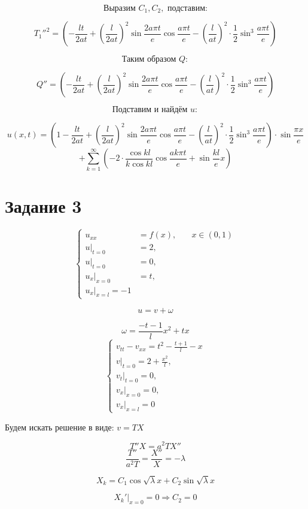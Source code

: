 \documentclass[a4paper,12pt]{article}
\begin{document}
$$\text{Выразим } C_1, C_2, \text{ подставим:}$$

$$T_1''^2 = \left(-\frac{lt}{2at} + \left(\frac{l}{2at}\right)^2 \sin \frac{2a\pi t}{e} \cos \frac{a\pi t}{e} - \left(\frac{l}{at}\right)^2 \cdot \frac{1}{2} \sin^3 \frac{a\pi t}{e} \right)$$

$$\text{Таким образом } Q:$$

$$Q'' = \left(-\frac{lt}{2at} + \left(\frac{l}{2at}\right)^2 \sin \frac{2a\pi t}{e} \cos \frac{a\pi t}{e} - \left(\frac{l}{at}\right)^2 \cdot \frac{1}{2} \sin^3 \frac{a\pi t}{e} \right)$$

$$\text{Подставим и найдём } u:$$

$$u(x,t) = \left(1 - \frac{lt}{2at} + \left(\frac{l}{2at}\right)^2 \sin \frac{2a\pi t}{e} \cos \frac{a\pi t}{e} - \left(\frac{l}{at}\right)^2 \cdot \frac{1}{2} \sin^3 \frac{a\pi t}{e} \right) \cdot \sin \frac{\pi x}{e} $$
$$+ \sum_{k=1}^{\infty} \left( -2 \cdot \frac{\cos kl}{k \cos kl} \cos \frac{a k \pi t}{e} + \sin \frac{kl}{e} x \right)$$

\section{Задание 3}
$$\left\{
\begin{aligned}
  u_{xx} &= f(x), \quad &x \in (0,1) \\
  u|_{t=0} &= 2, \\
  u|_{t=0} &= 0, \\
  u_x|_{x=0} &= t, \\
  u_x|_{x = l} = -1
\end{aligned}
\right.$$

$$u = v + \omega$$

$$\omega = \frac{-t-1}{l}x^2 + tx$$
$$
\begin{cases}
v_{tt} - v_{xx} = t^2 - \frac{t+1}{l} - x \\
v|_{t=0} = 2 + \frac{x^2}{l}, \\
v_t|_{t=0} = 0, \\
v_x|_{x=0} = 0, \\
v_x|_{x=l} = 0
\end{cases}
$$

Будем искать решение в виде: $v = TX$

$$T'' X = a^2 T X'' $$
$$\frac{T''}{a^2 T} = \frac{X''}{X} = -\lambda$$

$$X_k = C_1 \cos\sqrt{\lambda}x + C_2 \sin\sqrt{\lambda}x$$

$$X_k'|_{x = 0} = 0 \Rightarrow C_2 = 0$$
\end{document}
